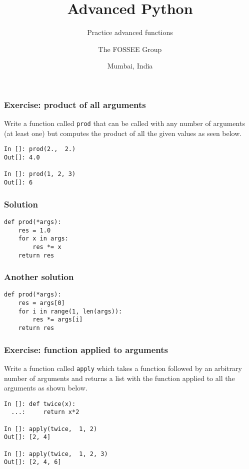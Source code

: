 \documentclass[14pt,compress]{beamer}
\title[Practice advanced functions]{Advanced Python}
\subtitle{Practice advanced functions}
\author[FOSSEE] {The FOSSEE Group}
\institute[IIT Bombay] {Department of Aerospace Engineering\\IIT Bombay}
\date[] {Mumbai, India}
\begin{document}
\begin{frame}
  \titlepage
\end{frame}

\begin{frame}
  \frametitle{Exercise: product of all arguments}
  \begin{block}{}
    Write a function called \lstinline{prod} that can be called with any
    number of arguments (at least one) but computes the product of all the
    given values as seen below.
  \end{block}

\begin{lstlisting}
In []: prod(2.,  2.)
Out[]: 4.0

In []: prod(1, 2, 3)
Out[]: 6
\end{lstlisting}
\end{frame}

\begin{frame}
  \frametitle{Solution}
\begin{lstlisting}
def prod(*args):
    res = 1.0
    for x in args:
        res *= x
    return res

\end{lstlisting}
\end{frame}

\begin{frame}
  \frametitle{Another solution}
\begin{lstlisting}
def prod(*args):
    res = args[0]
    for i in range(1, len(args)):
        res *= args[i]
    return res

\end{lstlisting}
\end{frame}


\begin{frame}
  \frametitle{Exercise: function applied to arguments}
  \begin{block}{}
    Write a function called \lstinline{apply} which takes a function followed
    by an arbitrary number of arguments and returns a list with the function
    applied to all the arguments as shown below.
  \end{block}

\begin{lstlisting}
In []: def twice(x):
  ...:     return x*2

In []: apply(twice,  1, 2)
Out[]: [2, 4]

In []: apply(twice,  1, 2, 3)
Out[]: [2, 4, 6]

\end{lstlisting}
\end{frame}
\end{document}

